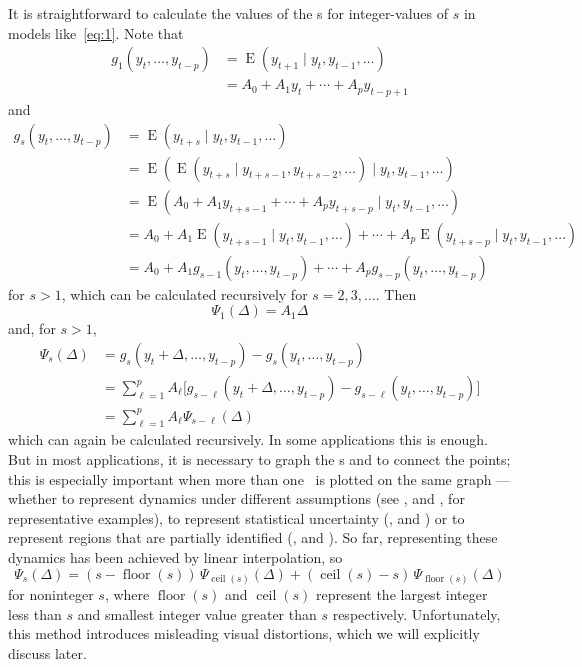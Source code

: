 \documentclass[12pt,fleqn]{article}
\DeclareMathOperator{\E}{E}
\DeclareMathOperator{\floor}{floor}
\DeclareMathOperator{\ceil}{ceil}
\begin{document}
It is straightforward to calculate the values of the \IRF s for
integer-values of $s$ in models like~\eqref{eq:1}.
Note that
\begin{align*}
  g_1(y_t,\dots,y_{t-p}) &= \E(y_{t+1} \mid y_t, y_{t-1},\dots) \\
  &= A_0 + A_1 y_{t} + \cdots + A_p y_{t-p+1}
\end{align*}
and
\begin{align*}
  g_s(y_t,\dots,y_{t-p})
  &= \E(y_{t+s} \mid y_t, y_{t-1},\dots) \\
  &= \E( \E(y_{t+s} \mid y_{t+s-1}, y_{t+s-2},\dots) \mid y_t, y_{t-1},\dots) \\
  &= \E( A_0 + A_1 y_{t+s-1} + \cdots + A_p y_{t+s-p} \mid y_t, y_{t-1},\dots) \\
  &= A_0 + A_1 \E(y_{t+s-1} \mid y_t, y_{t-1},\dots) + \cdots + A_p \E(y_{t+s-p} \mid y_t, y_{t-1},\dots) \\
  &= A_0 + A_1 g_{s-1}(y_t,\dots,y_{t-p}) + \cdots + A_p g_{s-p}(y_t,\dots,y_{t-p})
\end{align*}
for $s > 1$, which can be calculated recursively for $s =
2,3,\dots$. Then
\begin{equation*}
  \Psi_1(\Delta) = A_1 \Delta
\end{equation*}
and, for $s > 1$,
\begin{align*}
  \Psi_s(\Delta)
  &= g_s(y_t + \Delta,\dots,y_{t-p}) - g_s(y_t,\dots,y_{t-p}) \\
  &= \sum_{\ell = 1}^{p} A_\ell \big[g_{s-\ell}(y_t+\Delta,\dots,y_{t-p}) - g_{s-\ell}(y_t,\dots,y_{t-p})\big] \\
  &= \sum_{\ell = 1}^{p} A_\ell \Psi_{s-\ell}(\Delta)
\end{align*}
which can again be calculated recursively. In some applications this
is enough. But in most applications, it is necessary to graph the \IRF
s and to connect the points; this is especially important when more
than one \IRF\ is plotted on the same graph --- whether to represent
dynamics under different assumptions (see \citealp{BeM:98}, and
\citealp{StW:01}, for representative examples), to represent
statistical uncertainty (\citealp{Kil:98}, and \citealp{SiZ:99}) or to
represent regions that are partially identified (\citealp{Uhl:05}, and
\citealp{InK:13}). So far, representing these dynamics has been
achieved by linear interpolation, so
\begin{equation*}
  \Psi_s(\Delta) = (s - \floor(s)) \, \Psi_{\ceil(s)}(\Delta) + (\ceil(s) - s) \, \Psi_{\floor(s)}(\Delta)
\end{equation*}
for noninteger $s$, where $\floor(s)$ and $\ceil(s)$ represent the
largest integer less than $s$ and smallest integer value greater than
$s$ respectively. Unfortunately, this method introduces misleading
visual distortions, which we will explicitly discuss later.
\end{document}
